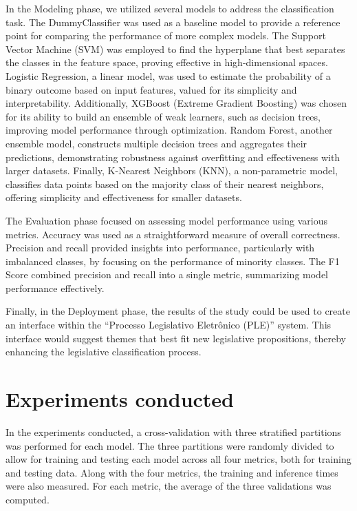 \documentclass[12pt]{article}
\begin{document}
In the Modeling phase, we utilized several models to address the classification task. The DummyClassifier was used as a baseline model to provide a reference point for comparing the performance of more complex models. The Support Vector Machine (SVM) was employed to find the hyperplane that best separates the classes in the feature space, proving effective in high-dimensional spaces. Logistic Regression, a linear model, was used to estimate the probability of a binary outcome based on input features, valued for its simplicity and interpretability. Additionally, XGBoost (Extreme Gradient Boosting) was chosen for its ability to build an ensemble of weak learners, such as decision trees, improving model performance through optimization. Random Forest, another ensemble model, constructs multiple decision trees and aggregates their predictions, demonstrating robustness against overfitting and effectiveness with larger datasets. Finally, K-Nearest Neighbors (KNN), a non-parametric model, classifies data points based on the majority class of their nearest neighbors, offering simplicity and effectiveness for smaller datasets.

The Evaluation phase focused on assessing model performance using various metrics. Accuracy was used as a straightforward measure of overall correctness. Precision and recall provided insights into performance, particularly with imbalanced classes, by focusing on the performance of minority classes. The F1 Score combined precision and recall into a single metric, summarizing model performance effectively.

Finally, in the Deployment phase, the results of the study could be used to create an interface within the “Processo Legislativo Eletrônico (PLE)” system. This interface would suggest themes that best fit new legislative propositions, thereby enhancing the legislative classification process.

\section{Experiments conducted}

In the experiments conducted, a cross-validation with three stratified partitions was performed for each model. The three partitions were randomly divided to allow for training and testing each model across all four metrics, both for training and testing data. Along with the four metrics, the training and inference times were also measured. For each metric, the average of the three validations was computed.
\end{document}
